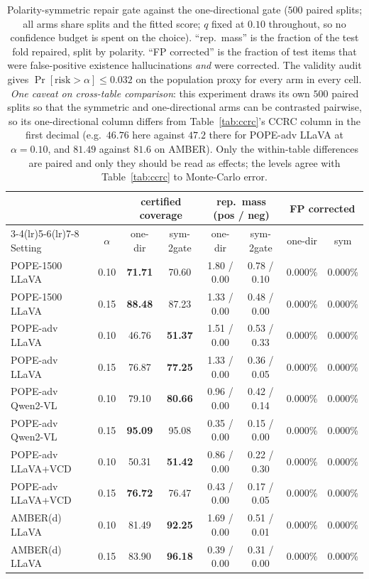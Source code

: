 \documentclass{article}
\theoremstyle{plain}
\theoremstyle{definition}
\theoremstyle{remark}
\begin{document}
\begin{table}[t]
\centering
\caption{Polarity-symmetric repair gate against the one-directional gate ($500$ paired splits;
all arms share splits and the fitted score; $q$ fixed at $0.10$ throughout, so no confidence
budget is spent on the choice). ``rep.\ mass'' is the fraction of the test fold repaired, split
by polarity. ``FP corrected'' is the fraction of test items that were false-positive existence
hallucinations \emph{and} were corrected. The validity audit gives
$\Pr[\text{risk}>\alpha]\le0.032$ on the population proxy for every arm in every cell.
\emph{One caveat on cross-table comparison}: this experiment draws its own $500$ paired splits
so that the symmetric and one-directional arms can be contrasted pairwise, so its one-directional
column differs from Table~\ref{tab:ccrc}'s CCRC column in the first decimal (e.g.\ $46.76$ here
against $47.2$ there for POPE-adv LLaVA at $\alpha=0.10$, and $81.49$ against $81.6$ on AMBER).
Only the within-table differences are paired and only they should be read as effects; the levels
agree with Table~\ref{tab:ccrc} to Monte-Carlo error.}
\label{tab:sym}
\small
\begin{tabular}{lccccccc}
\toprule
& & \multicolumn{2}{c}{certified coverage} & \multicolumn{2}{c}{rep.\ mass (pos / neg)}
& \multicolumn{2}{c}{FP corrected}\\
\cmidrule(lr){3-4}\cmidrule(lr){5-6}\cmidrule(lr){7-8}
Setting & $\alpha$ & one-dir & sym-2gate & one-dir & sym-2gate & one-dir & sym\\
\midrule
POPE-1500 LLaVA    & 0.10 & \textbf{71.71} & 70.60 & 1.80 / 0.00 & 0.78 / 0.10 & 0.000\% & 0.000\%\\
POPE-1500 LLaVA    & 0.15 & \textbf{88.48} & 87.23 & 1.33 / 0.00 & 0.48 / 0.00 & 0.000\% & 0.000\%\\
POPE-adv LLaVA     & 0.10 & 46.76 & \textbf{51.37} & 1.51 / 0.00 & 0.53 / 0.33 & 0.000\% & 0.000\%\\
POPE-adv LLaVA     & 0.15 & 76.87 & \textbf{77.25} & 1.33 / 0.00 & 0.36 / 0.05 & 0.000\% & 0.000\%\\
POPE-adv Qwen2-VL  & 0.10 & 79.10 & \textbf{80.66} & 0.96 / 0.00 & 0.42 / 0.14 & 0.000\% & 0.000\%\\
POPE-adv Qwen2-VL  & 0.15 & \textbf{95.09} & 95.08 & 0.35 / 0.00 & 0.15 / 0.00 & 0.000\% & 0.000\%\\
POPE-adv LLaVA+VCD & 0.10 & 50.31 & \textbf{51.42} & 0.86 / 0.00 & 0.22 / 0.30 & 0.000\% & 0.000\%\\
POPE-adv LLaVA+VCD & 0.15 & \textbf{76.72} & 76.47 & 0.43 / 0.00 & 0.17 / 0.05 & 0.000\% & 0.000\%\\
AMBER(d) LLaVA     & 0.10 & 81.49 & \textbf{92.25} & 1.69 / 0.00 & 0.51 / 0.01 & 0.000\% & 0.000\%\\
AMBER(d) LLaVA     & 0.15 & 83.90 & \textbf{96.18} & 0.39 / 0.00 & 0.31 / 0.00 & 0.000\% & 0.000\%\\
\bottomrule
\end{tabular}
\end{table}
\end{document}
